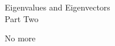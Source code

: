 \documentclass{titlescreen}
\begin{document}
\begin{videotitle}
  Eigenvalues and Eigenvectors \\[1ex]
  Part Two
\end{videotitle}
\begin{videoend}
  No more
\end{videoend}





\end{document}
